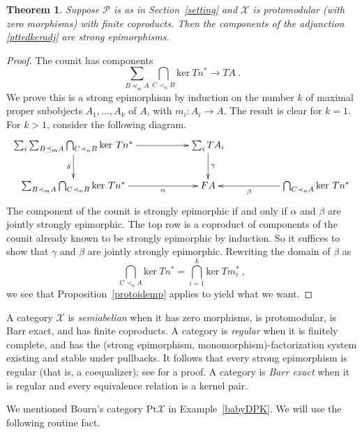 \documentclass[a4paper,12pt,reqno]{amsart}
\newtheorem{theorem}{Theorem}[section] %
\theoremstyle{definition}
\theoremstyle{fact}
\theoremstyle{genquest}
\theoremstyle{step}
\newcommand{\lra}{\longrightarrow}
\newcommand{\ra}{\rightarrow}
\def\CP{{\mathscr P}}
\def\CX{{\mathscr X}}
\begin{document}
\begin{theorem}\label{protocounit}
Suppose $\CP$ is as in Section~\ref{setting} and $\CX$ is protomodular (with zero morphisms) with finite coproducts.
Then the components of the adjunction \eqref{pttedkeradj} are strong epimorphisms.
\end{theorem}
\begin{proof}
The counit has components
$$\sum_{B\preceq_mA}{\bigcap_{C\prec_n B}{\mathrm{ker} \ Tn^*}} \lra TA \ .$$
We prove this is a strong epimorphism by induction on the number $k$ of maximal
proper subobjects $A_1, \dots, A_k$ of $A$, with $m_i:A_i\ra A$. 
The result is clear for $k=1$. For $k>1$, consider the following diagram.
\begin{eqnarray*}
\xymatrix{
\sum_i{\sum_{B\preceq_mA}{\bigcap_{C\prec_n B}{\mathrm{ker} \ Tn^*}}} \ar[rr]^-{ } \ar[d]_-{\delta} && \sum_i{TA_i} \ar[d]^-{\gamma} && \\
\sum_{B\prec_mA}{\bigcap_{C\prec_n B}{\mathrm{ker} \ Tn^*}} \ar[rr]_-{\alpha} && FA && \bigcap_{C\prec_n A}{{\mathrm{ker} \ Tn^*}} \ar[ll]^-{\beta}}
\end{eqnarray*}
The component of the counit is strongly epimorphic if and only if $\alpha$ and
$\beta$ are jointly strongly epimorphic.
The top row is a coproduct of components of the counit already known to be strongly
epimorphic by induction. 
So it suffices to show that $\gamma$ and $\beta$ are jointly strongly epimorphic.
Rewriting the domain of $\beta$ as
$$\bigcap_{C\prec_n A}{{\mathrm{ker} \ Tn^*}} = \bigcap_{i=1}^k{{\mathrm{ker} \ Tm_i^*}} \ ,$$
we see that Proposition~\ref{protoidemp} applies to yield what we want.
\end{proof}

A category $\CX$ is {\em semiabelian} \cite{JMT} when it has zero morphisms, 
is protomodular, is Barr exact, and has finite coproducts.
A category is {\em regular} \cite{Excat} when it is finitely complete, and has the 
(strong epimorphism, monomorphism)-factorization system existing 
and stable under pullbacks. 
It follows that every strong epimorphism is regular (that is, a coequalizer);
see \cite{CarSt86} for a proof. 
A category is {\em Barr exact} when it is regular and every equivalence relation 
is a kernel pair. 

We mentioned Bourn's category $\mathrm{Pt} \CX$ in Example~\ref{babyDPK}.
We will use the following routine fact.
\end{document}
